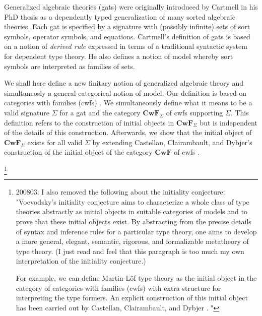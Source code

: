 \documentclass{lmcs}
\def\Cwf{\mathbf{CwF}}
\begin{document}
Generalized algebraic theories (gats) were originally introduced by Cartmell in his PhD thesis \cite{cartmell:phd} as a dependently typed generalization of many sorted algebraic theories. Each gat is specified by a signature with (possibly infinite) sets of sort symbols, operator symbols, and equations. Cartmell's definition of gats \cite{cartmell:phd,cartmell:apal} is based on a notion of {\em derived rule} expressed in terms of a traditional syntactic system for dependent type theory. He also defines a notion of model whereby sort symbols are interpreted as families of sets.

We shall here define a new finitary notion of generalized algebraic theory and simultaneosly a general categorical notion of model. Our definition is based on categories with families (cwfs) \cite{dybjer:torino}. We simultaneously define what it means to be a valid signature $\Sigma$ for a gat and the category $\Cwf_\Sigma$ of cwfs supporting $\Sigma$. This definition refers to the construction of initial objects in $\Cwf_\Sigma$ but is independent of the details of this construction. Afterwards, we show that the initial object of $\Cwf_\Sigma$ exists for all valid $\Sigma$ by extending Castellan, Clairambault, and Dybjer's  construction of the initial object of the category $\Cwf$ of cwfs \cite{castellan:tlca2015,castellan:lmcs}.

\footnote{200803: I also removed the following about the initiality conjecture: "Voevodsky's initiality conjecture \cite{voevodsky:initiality} aims to characterize a whole class of type theories abstractly as initial objects in suitable categories of models and to prove that these initial objects exist. By abstracting from the precise details of syntax and inference rules for a particular type theory, one aims to develop a more general, elegant, semantic, rigorous, and formalizable metatheory of type theory. (I just read  \cite{voevodsky:initiality} and feel that this paragraph is too much my own interpretation of the initiality conjecture.)

For example, we can define Martin-Löf type theory as the initial object in the category of categories with families (cwfs) with extra structure for interpreting the type formers. An explicit construction of this initial object has been carried out by Castellan, Clairambault, and Dybjer \cite{castellan:tlca2015,castellan:lmcs}. "}
\end{document}
